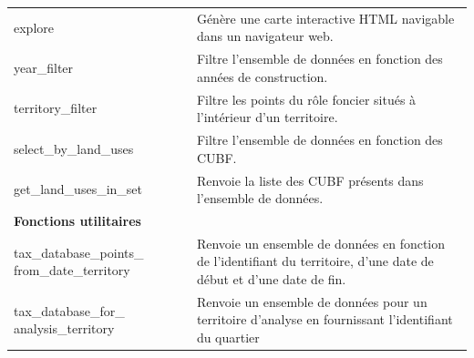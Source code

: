 {\begin{longtable}{p{5cm}p{11cm}}
                explore & Génère une carte interactive HTML navigable dans un navigateur web. \\
                year\_filter & Filtre l'ensemble de données en fonction des années de construction. \\
                territory\_filter& Filtre les points du rôle foncier situés à l'intérieur d'un territoire. \\
                select\_by\_land\_uses & Filtre l'ensemble de données en fonction des \ac{CUBF}. \\
                get\_land\_uses\_in\_set & Renvoie la liste des \ac{CUBF} présents dans l'ensemble de données. \\
                \midrule
                \multicolumn{2}{l}{\textbf{Fonctions utilitaires}} \\
                \midrule
                tax\_database\_points\_ from\_date\_territory & Renvoie un ensemble de données en fonction de l'identifiant du territoire, d'une date de début et d'une date de fin. \\
                tax\_database\_for\_ analysis\_territory & Renvoie un ensemble de données pour un territoire d'analyse en fournissant l'identifiant du quartier \\
            \end{longtable}}
            \clearpage
